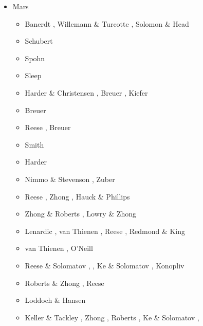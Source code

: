 \begin{itemize}
\item Mars \\
\begin{scriptsize}
\begin{itemize}
\item[\nineteeneightytwo] Banerdt \etal \cite{baps82}, Willemann \& Turcotte \cite{witu82},
                          Solomon \& Head \cite{sohe82}
\item[\nineteenninety] Schubert \etal \cite{scbg90}
\item[\nineteenninetyone] Spohn \cite{spoh91}
\item[\nineteenninetyfour] Sleep \cite{slee94}
\item[\nineteenninetysix] Harder \& Christensen \cite{hach96}, Breuer \etal \cite{brzy96},
                          Kiefer \etal \cite{kibn96}
\item[\nineteenninetyseven] Breuer \etal \cite{brys97}
\item[\nineteenninetyeight] Reese \etal \cite{resm98}, Breuer \etal \cite{brys98}
\item[\nineteenninetynine] Smith \etal \cite{smst99}
\item[\twothousand] Harder \cite{hard00}
\item[\twothousandone] Nimmo \& Stevenson \cite{nist01}, Zuber \cite{zube01}
\item[\twothousandtwo] Reese \etal \cite{resb02}, Zhong \cite{zhon02},
                       Hauck \& Phillips \cite{haph02}
\item[\twothousandthree] Zhong \& Roberts \cite{zhro03}, Lowry \& Zhong \cite{lozh03}
\item[\twothousandfour] Lenardic \etal \cite{lenm04}, van Thienen \etal \cite{vavv04c}, 
                        Reese \etal \cite{resb04}, Redmond \& King \cite{reki04}
\item[\twothousandfive] van Thienen \etal \cite{vavv05}, O'Neill \etal \cite{onml05}
\item[\twothousandsix] Reese \& Solomatov \cite{reso06}, \cite{losh06,rozh06}, 
                       Ke \& Solomatov \cite{keso06}, Konopliv \etal \cite{koys06}
\item[\twothousandseven] Roberts \& Zhong \cite{rozh07}, Reese \etal \cite{reso07b}
\item[\twothousandeight] Loddoch \& Hansen \cite{loha08}
\item[\twothousandnine] Keller \& Tackley \cite{keta09}, Zhong \cite{zhon09}, 
                        Roberts \etal \cite{rolm09}, Ke \& Solomatov \cite{keso09},

\end{itemize}
\end{scriptsize}
\end{itemize}
